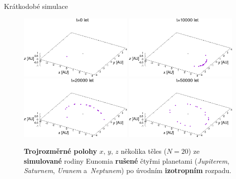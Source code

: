 \documentclass[xcolor=dvipsnames]{beamer}
\begin{document}
\begin{frame}[t]{\secname}{Krátkodobé simulace}
\begin{figure}
	\centering
	\includegraphics[width=0.49\textwidth]{../obr/trajec_001t.png}
	\includegraphics[width=0.49\textwidth]{../obr/trajec_101t.png} \\
	\includegraphics[width=0.49\textwidth]{../obr/trajec_201t.png}
	\includegraphics[width=0.49\textwidth]{../obr/trajec_501t.png}
	\caption{\textbf{Trojrozměrné polohy} $x,\,y,\,z$ několika těles ($N=20$) ze \textbf{simulované} rodiny Eunomia \textbf{rušené} čtyřmi planetami (\textit{Jupiterem}, \textit{Saturnem}, \textit{Uranem} a~\textit{Neptunem}) po úvodním \textbf{izotropním} rozpadu.} \label{fig:trajec}
\end{figure}
\end{frame}
\end{document}
